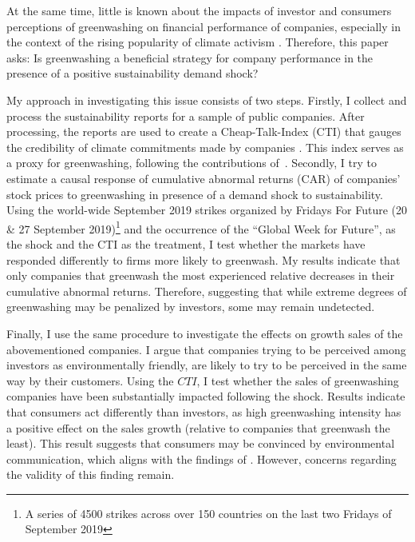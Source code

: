 \documentclass[12pt]{article}
\begin{document}
At the same time, little is known about the impacts of investor and consumers perceptions of greenwashing on financial performance of companies, especially in the context of the rising popularity of climate activism \parencite{pew2021genz}. Therefore, this paper asks: Is greenwashing a beneficial strategy for company performance in the presence of a positive sustainability demand shock?

My approach in investigating this issue consists of two steps. Firstly, I collect and process the sustainability reports for a sample of public companies. After processing, the reports are used to create a Cheap-Talk-Index (CTI) that gauges the credibility of climate commitments made by companies \parencite{binglerHowCheapTalk2024}. This index serves as a proxy for greenwashing, following the contributions of~\cite{coenAreCorporateClimate2022}. Secondly, I try to estimate a causal response of cumulative abnormal returns (CAR) of companies' stock prices to greenwashing in presence of a demand shock to sustainability. Using the world-wide September 2019 strikes organized by Fridays For Future (20 \& 27 September 2019)\footnote{A series of 4500 strikes across over 150 countries on the last two Fridays of September 2019} and the occurrence of the ``Global Week for Future'', as the shock and the CTI as the treatment, I test whether the markets have responded differently to firms more likely to greenwash. My results indicate that only companies that greenwash the most experienced relative decreases in their cumulative abnormal returns. Therefore, suggesting that while extreme degrees of greenwashing may be penalized by investors, some may remain undetected. 

Finally, I use the same procedure to investigate the effects on growth sales of the abovementioned companies. I argue that companies trying to be perceived among investors as environmentally friendly, are likely to try to be perceived in the same way by their customers. Using the $CTI$, I test whether the sales of greenwashing companies have been substantially impacted following the shock. Results indicate that consumers act differently than investors, as high greenwashing intensity has a positive effect on the sales growth (relative to companies that greenwash the least). This result suggests that consumers may be convinced by environmental communication, which aligns with the findings of \textcite{schmuckMisleadingConsumersGreen2018,parguelCanEvokingNature2015}. However, concerns regarding the validity of this finding remain.
 
\end{document}

